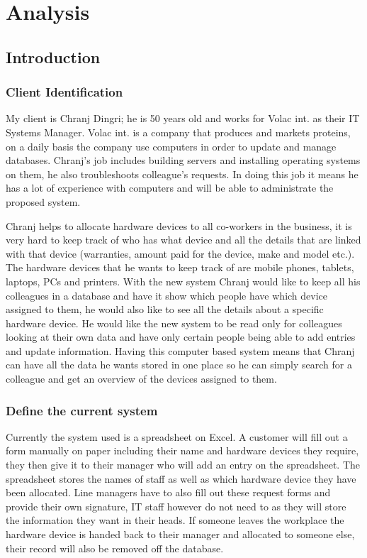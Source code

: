 \chapter{Analysis}

\section{Introduction}

\subsection{Client Identification}

My client is Chranj Dingri; he is 50 years old and works for Volac int. as their IT Systems Manager. Volac int. is a company that produces and markets proteins, on a daily basis the company use computers in order to update and manage databases. Chranj's job includes building servers and installing operating systems on them, he also troubleshoots colleague's requests. In doing this job it means he has a lot of experience with computers and will be able to administrate the proposed system.


Chranj helps to allocate hardware devices to all co-workers in the business, it is very hard to keep track of who has what device and all the details that are linked with that device (warranties, amount paid for the device, make and model etc.). The hardware devices that he wants to keep track of are mobile phones, tablets, laptops, PCs and printers. With the new system Chranj would like to keep all his colleagues in a database and have it show which people have which device assigned to them, he would also like to see all the details about a specific hardware device. He would like the new system to be read only for colleagues looking at their own data and have only certain people being able to add entries and update information. Having this computer based system means that Chranj can have all the data he wants stored in one place so he can simply search for a colleague and get an overview of the devices assigned to them. 

\subsection{Define the current system}

Currently the system used is a spreadsheet on Excel. A customer will fill out a form manually on paper including their name and hardware devices they require, they then give it to their manager who will add an entry on the spreadsheet.  The spreadsheet stores the names of staff as well as which hardware device they have been allocated. Line managers have to also fill out these request forms and provide their own signature, IT staff however do not need to as they will store the information they want in their heads. If someone leaves the workplace the hardware device is handed back to their manager and allocated to someone else, their record will also be removed off the database. 

